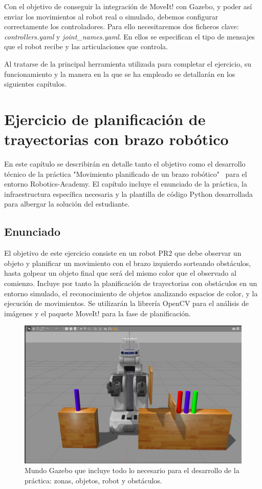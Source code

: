\documentclass[12pt,spanish,chapterprefix, numbers=noenddot]{book}
\numberwithin{equation}{section}
\numberwithin{figure}{section}
\begin{document}
Con el objetivo de conseguir la integración de MoveIt! con Gazebo, y poder así enviar los movimientos al robot real o simulado, debemos configurar correctamente los controladores. Para ello necesitaremos dos ficheros clave: \textit{controllers.yaml} y \textit{joint\_names.yaml}.  En ellos se especifican el tipo de mensajes que el robot recibe y las articulaciones que controla.  

Al tratarse de la principal herramienta utilizada para completar el ejercicio, su funcionamiento y la manera en la que se ha empleado se detallarán en los siguientes capítulos.

\chapter{Ejercicio de planificación de trayectorias con brazo robótico}
En este capítulo se describirán en detalle tanto el objetivo como el desarrollo técnico de la práctica "Movimiento planificado de un brazo robótico" \ para el entorno Robotics-Academy. 
El capítulo incluye el enunciado de la práctica, la infraestructura específica necesaria y la plantilla de código Python desarrollada para albergar la solución del estudiante. 

\section{Enunciado}
 El objetivo de este ejercicio consiste en un robot PR2 que debe observar un objeto y planificar un movimiento con el brazo izquierdo sorteando obstáculos, hasta golpear un objeto final que será del mismo color que el observado al comienzo. Incluye por tanto la planificación de trayectorias con obstáculos en un entorno simulado, el reconocimiento de objetos analizando espacios de color, y la ejecución de movimientos. Se utilizarán la librería OpenCV para el análisis de imágenes y el paquete MoveIt! para la fase de planificación. 

\begin{figure}[hbt!]
\centering
\includegraphics[width=12cm]{Figs/tfg_gazebo_world.png}
\par
\caption{\label{fig:Mundo-gazebo}Mundo Gazebo que incluye todo lo necesario para el desarrollo de la práctica: zonas, objetos, robot y obstáculos.}
\end{figure}
\end{document}
